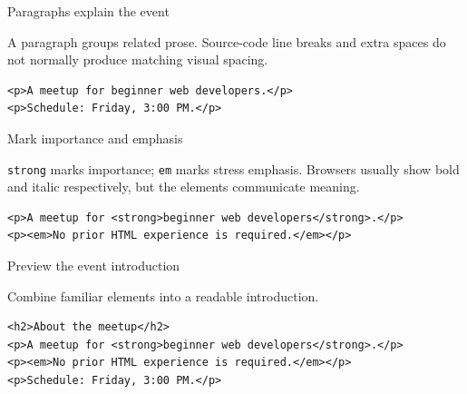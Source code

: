 \documentclass[aspectratio=169,12pt]{beamer}
\begin{document}
\begin{frame}[fragile]{Paragraphs explain the event}
\begin{conceptblock}
A paragraph groups related prose. Source-code line breaks and extra spaces do not normally produce matching visual spacing.
\end{conceptblock}
\begin{lstlisting}
<p>A meetup for beginner web developers.</p>
<p>Schedule: Friday, 3:00 PM.</p>
\end{lstlisting}

\end{frame}

\begin{frame}[fragile]{Mark importance and emphasis}
\begin{conceptblock}
\texttt{strong} marks importance; \texttt{em} marks stress emphasis. Browsers usually show bold and italic respectively, but the elements communicate meaning.
\end{conceptblock}
\begin{lstlisting}
<p>A meetup for <strong>beginner web developers</strong>.</p>
<p><em>No prior HTML experience is required.</em></p>
\end{lstlisting}

\end{frame}

\begin{frame}[fragile]{Preview the event introduction}
\begin{conceptblock}
Combine familiar elements into a readable introduction.
\end{conceptblock}
\begin{lstlisting}
<h2>About the meetup</h2>
<p>A meetup for <strong>beginner web developers</strong>.</p>
<p><em>No prior HTML experience is required.</em></p>
<p>Schedule: Friday, 3:00 PM.</p>
\end{lstlisting}

\end{frame}
\end{document}
